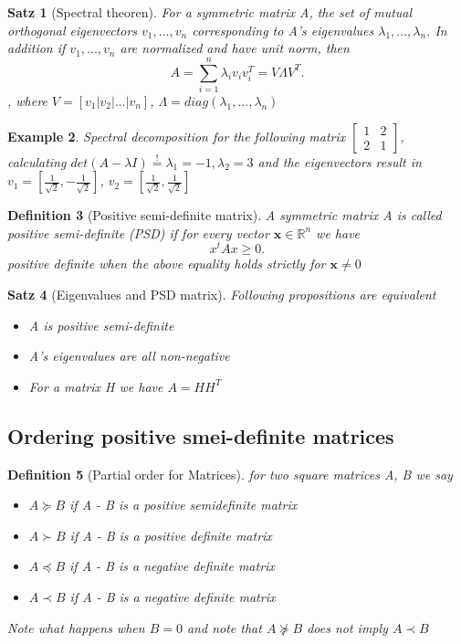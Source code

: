 \documentclass[11pt]{article}
\newtheorem{theorem}{Satz}
\newtheorem{definition}[theorem]{Definition}
\newtheorem{example}[theorem]{Example}
\begin{document}
\begin{theorem}[Spectral theoren]
    For a symmetric matrix A, the set of mutual orthogonal eigenvectors $v_1, ..., v_n$ corresponding to A's eigenvalues $\lambda_1, ..., \lambda_n$. In addition if $v_1, ..., v_n$ are normalized and have unit norm, then
    \[
    A = \sum_{i=1}^{n} \lambda_i v_i v_i^T = V \Lambda V^T  
    .\], where $V = [v_1 | v_2 | ... | v_n]$, $\Lambda = diag(\lambda_1, ..., \lambda_n)$ 
    
\end{theorem}

\begin{example}Spectral decomposition for the following matrix
    $\begin{bmatrix} 1 & 2 \\ 2 & 1 \end{bmatrix}$, calculating $det(A -\lambda I) \overset{!}{=} \lambda_1 = -1, \lambda_2 = 3$ and the eigenvectors result in $v_1 = [\frac{1}{\sqrt{2}}, -\frac{1}{\sqrt{2}}]$, $v_2 = [\frac{1}{\sqrt{2}}, \frac{1}{\sqrt{2}}]$   
\end{example}

\begin{definition}[Positive semi-definite matrix]
    A symmetric matrix A is called positive semi-definite (PSD) if for every vector $\textbf{x} \in \mathbb{R}^n $ we have 
    \[
    x^t A x \geq 0
    .\]
    positive definite when the above equality holds strictly for $\textbf{x}  \neq 0$ 
    
\end{definition}

\begin{theorem}[Eigenvalues and PSD matrix] Following propositions are equivalent
    \begin{itemize}
        \item A is positive semi-definite
        \item A's eigenvalues are all non-negative
        \item For a matrix H we have $ A = H H^T$ 
    \end{itemize}
\end{theorem}

\subsection*{Ordering positive smei-definite matrices}
\begin{definition}[Partial order for Matrices] for two square matrices A, B we say
    \begin{itemize}
        \item $A\succeq B$ if A - B is a positive semidefinite matrix
        \item $A \succ B$ if A - B is a positive definite matrix
        \item $A \preceq B$ if A - B is a negative definite matrix
        \item $A \prec B $ if A - B is a negative definite matrix 
    \end{itemize}
    Note what happens when $B = 0$ and note that $ A\nsucceq B $ does not imply $A \prec B$ %
    
    
\end{definition}
\end{document}
